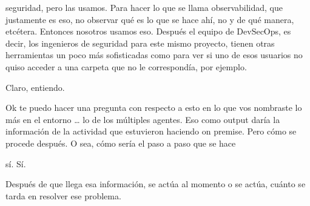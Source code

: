 \begin{description}[leftmargin=0cm, labelsep=0.5cm]
seguridad, pero las usamos. Para hacer lo que se llama observabilidad, que justamente es eso, no observar qué es lo que se hace ahí, no y de qué manera, etcétera. Entonces nosotros usamos eso. Después el equipo de DevSecOps, es decir, los ingenieros de seguridad para este mismo proyecto, tienen otras herramientas un poco más sofisticadas como para ver si uno de esos usuarios no quiso acceder a una carpeta que no le correspondía, por ejemplo.

    \item[\textbf{MUNTAABSKI FEDERICO:}] Claro, entiendo.

    \item[\textbf{MOCIULSKY SANTIAGO:}] Ok te puedo hacer una pregunta con respecto a esto en lo que vos nombraste lo más en el entorno … lo de los múltiples agentes. Eso como output daría la información de la actividad que estuvieron haciendo on premise. Pero cómo se procede después. O sea, cómo sería el paso a paso que se hace

    \item[\textbf{VILLARINO PABLO RODOLFO:}] sí. Sí.

    \item[\textbf{MOCIULSKY SANTIAGO:}] Después de que llega esa información, se actúa al momento o se actúa, cuánto se tarda en resolver ese problema.


\end{description}
